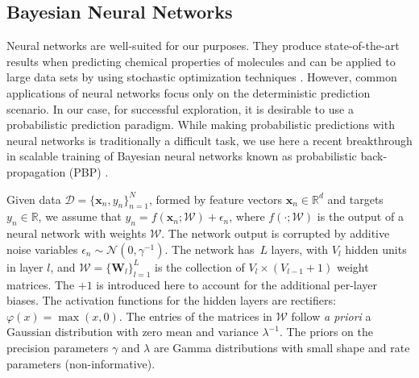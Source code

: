 \subsection{Bayesian Neural Networks}

Neural networks are well-suited for our purposes. They produce state-of-the-art results when predicting chemical properties of molecules \cite{Ma_2015,Mayr_2016,ramsundar2015massively} and can be applied to large data sets by using stochastic optimization techniques \cite{bousquet2008tradeoffs}. However, common applications of neural networks focus only on the deterministic prediction scenario. In our case, for successful exploration, it is desirable to use a probabilistic prediction paradigm. While making probabilistic predictions with neural networks is traditionally a difficult task, we use here a recent breakthrough in scalable training of Bayesian neural networks known as probabilistic back-propagation (PBP) \cite{hernandez2015probabilistic}. 

Given data ${\mathcal{D} = \{\mathbf{x}_n, y_n \}_{n=1}^N}$, formed by feature vectors $\mathbf{x}_n \in \mathbb{R}^d$ and targets ${y_n \in \mathbb{R}}$, we assume that $y_n = f(\mathbf{x}_n;\mathcal{W}) + \epsilon_n$, where $f(\cdot ;\mathcal{W})$ is the output of a neural network with weights $\mathcal{W}$. The network output is corrupted by additive noise variables $\epsilon_n \sim \mathcal{N}(0,\gamma^{-1})$. The network has~$L$ layers, with $V_l$ hidden units in layer $l$, and $\mathcal{W} = \{ \mathbf{W}_l \}_{l=1}^L$ is the collection of $V_l \times (V_{l-1}+1)$ weight matrices. The $+1$ is introduced here to account for the additional per-layer biases. The activation functions for the hidden layers are rectifiers: $\varphi(x) = \max(x,0)$. The entries of the matrices in $\mathcal{W}$ follow \emph{a priori} a Gaussian distribution with zero mean and variance $\lambda^{-1}$. The priors on the precision parameters $\gamma$ and $\lambda$ are Gamma distributions with small shape and rate parameters (non-informative).

